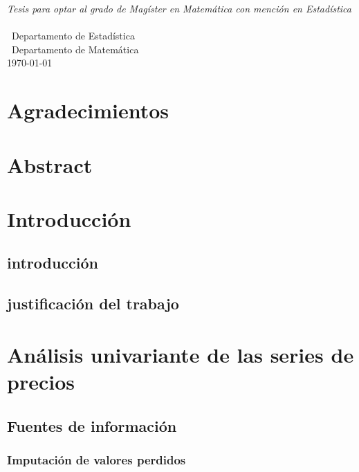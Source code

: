 \documentclass[12pt, twoside]{book}\usepackage[]{graphicx}\usepackage[]{color}
\numberwithin{equation}{section}
\numberwithin{theorem}{section}
\numberwithin{teorema}{section}
\numberwithin{defi}{section}
\numberwithin{prop}{section}
\numberwithin{defi}{section}
\theoremstyle{plain}
\begin{document}
\begin{titlepage}
\begin{center}
\large \textit{Tesis para optar al grado de Magíster en Matemática con mención en Estadística}\\[0.3cm] %
\textit{}\\[0.4cm]
\ Departamento de Estadística \\
[0.4cm]\ Departamento de Matemática
\\[1cm] %
 
{\large \today}\\[2cm] %
 
\end{center}

\end{titlepage}
\newpage



\tableofcontents

\listoffigures
\listoftables
\onehalfspacing
\chapter*{Agradecimientos}
\chapter*{Abstract}
\chapter{Introducción}
\section{introducción}
\section{justificación del trabajo}



\chapter{Análisis univariante de las series de precios}
\section{Fuentes de información}

\subsection{Imputación de valores perdidos}
\end{document}
